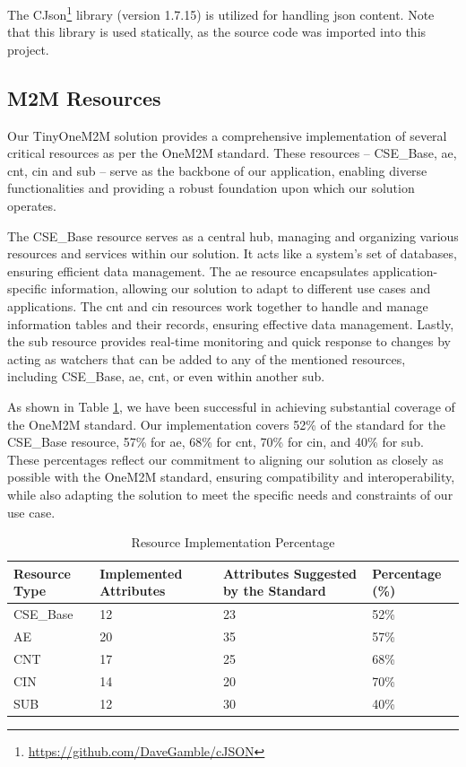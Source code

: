 \documentclass[a4paper,fleqn]{cas-dc}
\begin{document}
The CJson\footnote{\url{https://github.com/DaveGamble/cJSON}} library (version 1.7.15) is utilized for handling \gls{json} content. Note that this library is used statically, as the source code was imported into this project.

\subsection{M2M Resources}\label{sec:m2mresources}

Our TinyOneM2M solution provides a comprehensive implementation of several critical resources as per the OneM2M standard. These resources -- CSE\_Base, \gls{ae}, \gls{cnt}, \gls{cin} and \gls{sub} -- serve as the backbone of our application, enabling diverse functionalities and providing a robust foundation upon which our solution operates.

The CSE\_Base resource serves as a central hub, managing and organizing various resources and services within our solution. It acts like a system's set of databases, ensuring efficient data management. The \gls{ae} resource encapsulates application-specific information, allowing our solution to adapt to different use cases and applications. The \gls{cnt} and \gls{cin} resources work together to handle and manage information tables and their records, ensuring effective data management. Lastly, the \gls{sub} resource provides real-time monitoring and quick response to changes by acting as watchers that can be added to any of the mentioned resources, including CSE\_Base, \gls{ae}, \gls{cnt}, or even within another \gls{sub}.

As shown in Table \ref{tab:resourceimplementationpercentage}, we have been successful in achieving substantial coverage of the OneM2M standard. Our implementation covers 52\% of the standard for the CSE\_Base resource, 57\% for \gls{ae}, 68\% for \gls{cnt}, 70\% for \gls{cin}, and 40\% for \gls{sub}. These percentages reflect our commitment to aligning our solution as closely as possible with the OneM2M standard, ensuring compatibility and interoperability, while also adapting the solution to meet the specific needs and constraints of our use case.

\begin{table}[h]
\scriptsize
\centering
\caption{Resource Implementation Percentage}
\label{tab:resourceimplementationpercentage}
\begin{tabular}{p{1.5cm}p{1.5cm}p{1.5cm}p{1.5cm}}
\hline
\textbf{Resource Type} & \textbf{Implemented Attributes} & \textbf{Attributes Suggested by the Standard} & \textbf{Percentage (\%)} \\
\hline \hline
CSE\_Base & 12 & 23 & 52\% \\
AE & 20 & 35 & 57\% \\
CNT & 17 & 25 & 68\% \\
CIN & 14 & 20 & 70\% \\
SUB & 12 & 30 & 40\% \\
\hline
\end{tabular}
\end{table}
\end{document}
